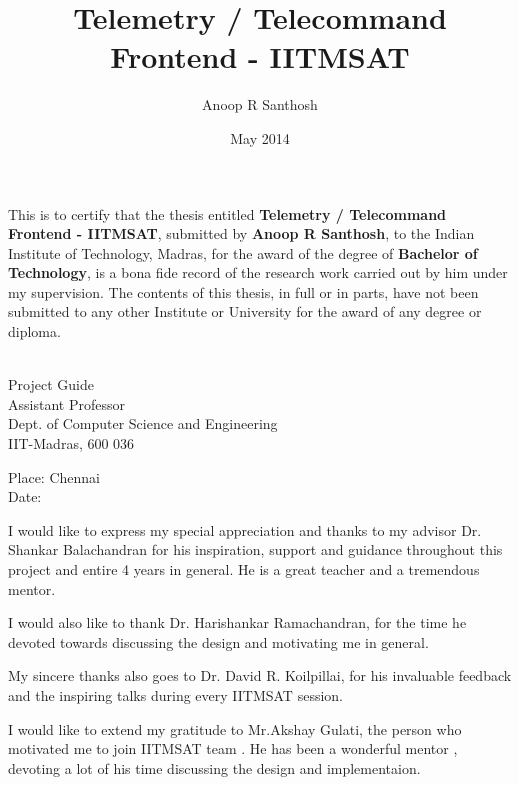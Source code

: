\documentclass[BTech]{iitmdiss}
\def\thesistitle{Telemetry / Telecommand Frontend - IITMSAT}
\def\thesisauthor{Anoop R Santhosh}
\begin{document}


\title{\thesistitle}

\author{\thesisauthor}

\date{May 2014}

\begin{singlespace}
\maketitle 
\end{singlespace} 



\certificate

\vspace*{0.5in}

\noindent This is to certify that the thesis entitled {\bf {\thesistitle}}, 
submitted by {\bf {\thesisauthor}}, to the Indian Institute of Technology, 
Madras, for the award of the degree of {\bf Bachelor of Technology}, 
is a bona fide record of the research work carried out by him under my
supervision. The contents of this thesis, in full or in parts, have not been
submitted to any other Institute or University for the award of any degree or
diploma.

\vspace*{1.4in}
\hspace*{-0.25in}
\begin{singlespace}
 \\
\noindent Project Guide \\ 
\noindent Assistant Professor \\
\noindent Dept. of Computer Science and Engineering\\
\noindent IIT-Madras, 600 036 \\
\end{singlespace}
\vspace*{0.20in}
\noindent Place: Chennai\\ 
Date:

\acknowledgements

I would like to express my special appreciation and thanks to my advisor Dr. Shankar Balachandran for his inspiration, support and guidance throughout this project and entire 4 years in general. He is a great teacher and a tremendous mentor.
\par I would also like to thank Dr. Harishankar Ramachandran, for the time he devoted towards discussing the design and motivating me in general.
\par My sincere thanks also goes to Dr. David R. Koilpillai, for his invaluable feedback and the inspiring talks during every IITMSAT session.
\par I would like to extend my gratitude to Mr.Akshay Gulati, the person who motivated me to join IITMSAT team . He has been a wonderful mentor , devoting a lot of his time discussing the design and implementaion.
\end{document}
